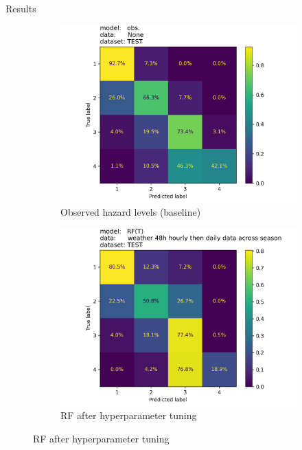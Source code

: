 \documentclass[final]{beamer}
\newlength{\colwidth}
\begin{document}
\begin{frame}[t]
\begin{columns}[t]
\begin{column}{\colwidth}
\begin{block}{Results}
    
\begin{figure}[htbp]
    \centering
    \begin{subfigure}[b]{0.32\textwidth}
        \centering
        \includegraphics[width=\textwidth]{assets/figures/sais_confusion_matrix_obs.___None_test.png}
        \caption{Observed hazard levels (baseline)}
        \label{fig:subfig1obs}
    \end{subfigure}
    \hfill
    \begin{subfigure}[b]{0.32\textwidth}
        \centering
        \includegraphics[width=\textwidth]{assets/figures/sais_confusion_matrix_RF(T)__weather_48h_hourly_then_daily_data_across_season_test.png}
        \caption{RF after hyperparameter tuning}
        \label{fig:subfig2rf}

\end{subfigure}
\end{figure}
\end{block}
\end{column}
\end{columns}
\end{frame}
\end{document}
